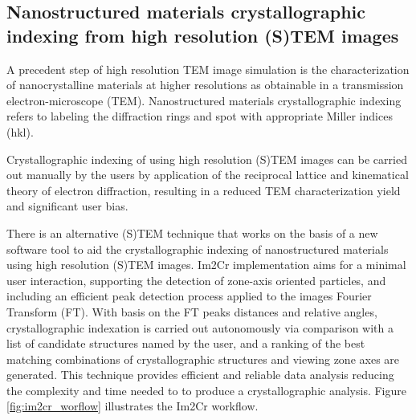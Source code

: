 \documentclass[
  oneside,
  11pt, a4paper,
  footinclude=true,
  headinclude=true,
  cleardoublepage=empty
]{scrbook}
\begin{document}
	\subsection{Nanostructured materials crystallographic indexing from high resolution (S)TEM images}
	
	A precedent step of high resolution TEM image simulation is the characterization of nanocrystalline materials at higher resolutions as obtainable in a transmission electron-microscope (TEM). Nanostructured materials crystallographic indexing refers to labeling the diffraction rings and spot with appropriate Miller indices (hkl).\par 
	 Crystallographic indexing of  using high resolution (S)TEM images
	 can be carried out manually by the users by application of the reciprocal lattice and kinematical theory of electron diffraction, resulting in a reduced TEM characterization yield and significant user bias.\par 
	 There is an alternative (S)TEM technique that works on the basis of a new software tool to aid the crystallographic indexing of nanostructured materials using high resolution (S)TEM images. Im2Cr \citep{asilva2016} implementation aims for a minimal user interaction, supporting the detection of zone-axis oriented particles, and including an efficient peak detection process applied to the images Fourier Transform (FT). With basis on the FT peaks distances and relative angles, crystallographic indexation is carried out autonomously via comparison with a list of candidate structures named by the user, and a ranking of the best matching combinations of crystallographic structures and viewing zone axes are generated. This technique provides efficient and reliable data analysis reducing the complexity and time needed to to produce a crystallographic analysis. Figure \ref{fig:im2cr_worflow} illustrates the Im2Cr workflow. 
\end{document}
